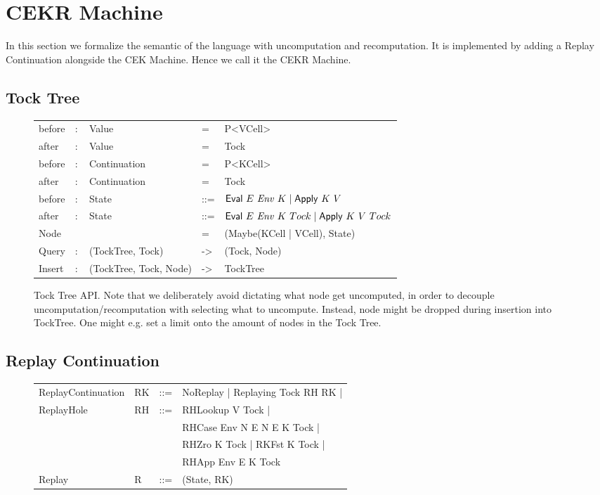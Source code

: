 \section{CEKR Machine}
In this section we formalize the semantic of the language with uncomputation and recomputation. It is implemented by adding a Replay Continuation alongside the CEK Machine.
Hence we call it the CEKR Machine.

\subsection{Tock Tree}
\begin{figure}
	\begin{tabular}{p{4em} p{2.6em} p{10em} p{1em} p{}}
	before & $:$ & Value & = & P<VCell> \\
	after & $:$ & Value & = & Tock \\
	before & $:$ & Continuation & = & P<KCell> \\
	after & $:$ & Continuation & = & Tock \\
	before & $:$ & State & ::= & $\text{\textsf{Eval}}~E~\mathit{Env}~K \mid \text{\textsf{Apply}}~K~V $ \\
	after & $:$ & State & ::= & $\text{\textsf{Eval}}~E~\mathit{Env}~K~Tock \mid \text{\textsf{Apply}}~K~V~Tock $ \\
	Node & & & = & (Maybe(KCell | VCell), State) \\
	Query & $:$ & (TockTree, Tock) & -> & (Tock, Node) \\
	Insert & $:$ & (TockTree, Tock, Node) & -> & TockTree \\
	\end{tabular}
	\caption{Tock Tree API. Note that we deliberately avoid dictating what node get uncomputed, in order to decouple uncomputation/recomputation with selecting what to uncompute. Instead, node might be dropped during insertion into TockTree. One might e.g. set a limit onto the amount of nodes in the Tock Tree. }
\end{figure}

\subsection{Replay Continuation}
\begin{figure}
\begin{tabular}{p{10em} p{2.6em} p{1em} p{}}
	ReplayContinuation & RK & ::= & NoReplay | Replaying Tock RH RK | \\
	ReplayHole & RH & ::= & RHLookup V Tock | \\
	& & & RHCase Env N E N E K Tock | \\
	& & & RHZro K Tock | RKFst K Tock | \\
	& & & RHApp Env E K Tock \\
	Replay & R & ::= & (State, RK) \\
\end{tabular}
\end{figure}

